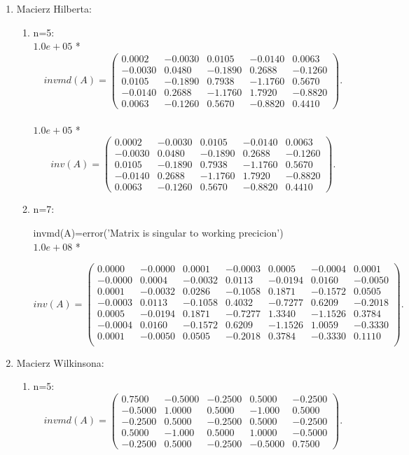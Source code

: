 \documentclass[12pt]{article}
\begin{document}
\begin{enumerate}
\item Macierz Hilberta:
\begin{enumerate}
\item n=5:
\\$1.0e+05$ *
\[
invmd(A)=\begin{pmatrix}
0.0002 & -0.0030 & 0.0105 & -0.0140 & 0.0063 \\
-0.0030 & 0.0480 & -0.1890 & 0.2688 & -0.1260 \\
0.0105 & -0.1890 & 0.7938 & -1.1760 & 0.5670 \\
-0.0140 & 0.2688 & -1.1760 & 1.7920 & -0.8820 \\
0.0063 & -0.1260  & 0.5670 & -0.8820 & 0.4410
\end{pmatrix}.
\]
\\
$1.0e+05$ *
\[
inv(A)=\begin{pmatrix}
0.0002 & -0.0030 & 0.0105 & -0.0140 & 0.0063 \\
-0.0030 & 0.0480 & -0.1890 & 0.2688 & -0.1260 \\
0.0105 & -0.1890 & 0.7938 & -1.1760 & 0.5670 \\
-0.0140 & 0.2688 & -1.1760 & 1.7920 & -0.8820 \\
0.0063 & -0.1260  & 0.5670 & -0.8820 & 0.4410
\end{pmatrix}.
\]
\item n=7:

invmd(A)=error('Matrix is singular to working precicion')
\\
$1.0e+08$ *

\[
inv(A)=\begin{pmatrix}
0.0000 & -0.0000 & 0.0001 & -0.0003 & 0.0005 & -0.0004 & 0.0001 \\
-0.0000 & 0.0004 & -0.0032 & 0.0113 & -0.0194 & 0.0160 & -0.0050 \\
0.0001 & -0.0032 & 0.0286 & -0.1058 & 0.1871 & -0.1572 & 0.0505 \\
-0.0003 & 0.0113 & -0.1058 & 0.4032 & -0.7277 & 0.6209 & -0.2018 \\
0.0005 & -0.0194  & 0.1871 & -0.7277 & 1.3340 & -1.1526 & 0.3784 \\
-0.0004 & 0.0160 & -0.1572 & 0.6209 & -1.1526 & 1.0059 & -0.3330\\
0.0001 & -0.0050 & 0.0505 & -0.2018 & 0.3784 & -0.3330 & 0.1110\\
\end{pmatrix}.
\]
\end{enumerate}
\newpage
\item Macierz Wilkinsona:
\begin{enumerate}
\item n=5:
\[
invmd(A)=\begin{pmatrix}
0.7500 & -0.5000 & -0.2500 & 0.5000 & -0.2500 \\
-0.5000 & 1.0000 & 0.5000 & -1.000 & 0.5000 \\
-0.2500 & 0.5000 & -0.2500 & 0.5000 & -0.2500 \\
0.5000 & -1.000 & 0.5000 & 1.0000 & -0.5000 \\
-0.2500 & 0.5000  & -0.2500 & -0.5000 & 0.7500
\end{pmatrix}.
\]


\end{enumerate}
\end{enumerate}
\end{document}
